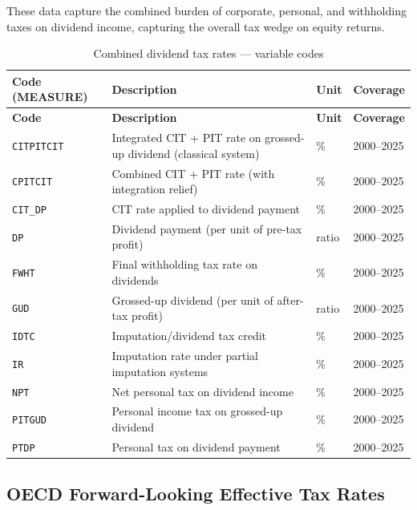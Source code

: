 \documentclass[11pt,a4paper]{article}
\newcommand{\code}[1]{\texttt{#1}}
\begin{document}
These data capture the combined burden of corporate, personal, and withholding taxes on dividend income, capturing the overall tax wedge on equity returns.

\begin{longtable}{@{}L{2.8cm} L{6.5cm} C{1.8cm} C{2.5cm}@{}}
\caption{Combined dividend tax rates --- variable codes}\label{tab:div_rates}\\
\toprule
\textbf{Code (MEASURE)} & \textbf{Description} & \textbf{Unit} & \textbf{Coverage} \\
\midrule
\endfirsthead
\toprule
\textbf{Code} & \textbf{Description} & \textbf{Unit} & \textbf{Coverage} \\
\midrule
\endhead
\bottomrule
\endlastfoot
\code{CITPITCIT}  & Integrated CIT + PIT rate on grossed-up dividend (classical system) & \% & 2000--2025 \\
\code{CPITCIT}    & Combined CIT + PIT rate (with integration relief) & \% & 2000--2025 \\
\code{CIT\_DP}    & CIT rate applied to dividend payment & \% & 2000--2025 \\
\code{DP}         & Dividend payment (per unit of pre-tax profit) & ratio & 2000--2025 \\
\code{FWHT}       & Final withholding tax rate on dividends & \% & 2000--2025 \\
\code{GUD}        & Grossed-up dividend (per unit of after-tax profit) & ratio & 2000--2025 \\
\code{IDTC}       & Imputation/dividend tax credit & \% & 2000--2025 \\
\code{IR}         & Imputation rate under partial imputation systems & \% & 2000--2025 \\
\code{NPT}        & Net personal tax on dividend income & \% & 2000--2025 \\
\code{PITGUD}     & Personal income tax on grossed-up dividend & \% & 2000--2025 \\
\code{PTDP}       & Personal tax on dividend payment & \% & 2000--2025 \\
\end{longtable}


\subsection{OECD Forward-Looking Effective Tax Rates}\label{sec:etr}
\end{document}
